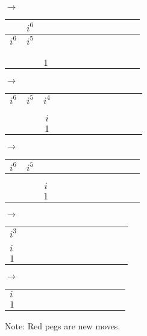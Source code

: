 \documentclass[12pt]{article}
\begin{document}
\begin{center}
$\longrightarrow$
\begin{tabular}{|l|c|c|c|c|c|c|c|c|c|c|r|}
    \hline
    \color{red}{$i^7$} & $i^6$ &\\
    \hline
    $i^6$ & $i^5$ & \color{red}{$i^4$}\\
    \hline
    & &\\
    \hline
    & &\\
    \hline
    & & \color{red}{$i$}\\
    \hline
    & & $1$\\
    \hline
\end{tabular}
$\longrightarrow$
\begin{tabular}{|l|c|c|c|c|c|c|c|c|c|c|r|}
    \hline
    & & \color{red}{$i^5$}\\
    \hline
    $i^6$ & $i^5$ & $i^4$\\
    \hline
    & &\\
    \hline
    & &\\
    \hline
    & & $i$\\
    \hline
    & & $1$\\
    \hline
\end{tabular}
$\longrightarrow$
\begin{tabular}{|l|c|c|c|c|c|c|c|c|c|c|r|}
    \hline
    $i^6$ & $i^5$ &\\
    \hline
    & & \color{red}{$i^3$}\\
    \hline
    & &\\
    \hline
    & & $i$\\
    \hline
    & & $1$\\
    \hline
\end{tabular}
$\longrightarrow$
\begin{tabular}{|l|c|c|c|c|c|c|c|c|c|c|r|}
    \hline
    \color{red}{$i^4$}\\
    \hline
    $i^3$\\
    \hline
    \\
    \hline
    $i$\\
    \hline
    $1$\\
    \hline
\end{tabular}
$\longrightarrow$
\begin{tabular}{|l|c|c|c|c|c|c|c|c|c|c|r|}
    \hline
    \color{red}{$i^2$}\\
    \hline
    $i$\\
    \hline
    $1$\\
    \hline
\end{tabular}

\noindent *Note: Red pegs are new moves.
\end{center}
\end{document}
